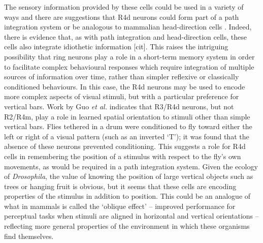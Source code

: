 The sensory information provided by these cells could be used in a variety of ways and there are suggestions that R4d neurons could form part of a path integration system \cite{Neuser2008} or be analogous to mammalian head-direction cells \cite{Tomchik2008}.
Indeed, there is evidence that, as with path integration and head-direction cells, these cells also integrate idiothetic information [cit].
This raises the intriguing possibility that ring neurons play a role in a short-term memory system in order to facilitate complex behavioural responses which require integration of multiple sources of information over time, rather than simpler reflexive or classically conditioned behaviours.
In this case, the R4d neurons may be used to encode more complex aspects of visual stimuli, but with a particular preference for vertical bars.
Work by Guo \emph{et al.} \cite{Guo2015} indicates that R3/R4d neurons, but not R2/R4m, play a role in learned spatial orientation to stimuli other than simple vertical bars.
Flies tethered in a drum were conditioned to fly toward either the left or right of a visual pattern (such as an inverted `T'); it was found that the absence of these neurons prevented conditioning.
This suggests a role for R4d cells in remembering the position of a stimulus with respect to the fly's own movements, as would be required in a path integration system.
Given the ecology of \emph{Drosophila}, the value of knowing the position of large vertical objects such as trees or hanging fruit is obvious, but it seems that these cells are encoding properties of the stimulus in addition to position.
This could be an analogue of what in mammals is called the `oblique effect' -- improved performance for perceptual tasks when stimuli are aligned in horizontal and vertical orientations \cite{Appelle1972} -- reflecting more general properties of the environment in which these organisms find themselves.

